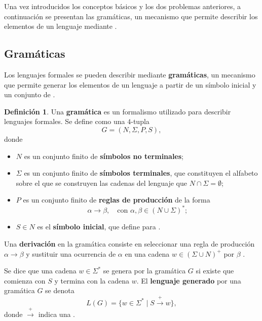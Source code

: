 \documentclass{report}
\theoremstyle{definition}
\newtheorem{definicion}{Definición}[chapter]
\theoremstyle{plain}
\theoremstyle{remark}
\begin{document}
Una vez introducidos los conceptos básicos y los dos problemas anteriores, a continuación se presentan las gramáticas, un mecanismo que permite describir los elementos de un lenguaje mediante .

\subsection{Gramáticas}
\label{sec:gramaticas}

Los lenguajes formales se pueden describir mediante \textbf{gramáticas}, un mecanismo que permite generar los elementos de un lenguaje a partir de un símbolo inicial y un conjunto de .

\begin{definicion}
  Una \textbf{gramática} es un formalismo utilizado para describir lenguajes formales. Se define como una $4$-tupla
\[
  G = (N, \Sigma, P, S),
\]
donde
\begin{itemize}
  \item $N$ es un conjunto finito de  \textbf{símbolos no terminales};
  \item $\Sigma$ es un conjunto finito de  \textbf{símbolos terminales}, que constituyen el alfabeto sobre el que se construyen las cadenas del lenguaje\quitaesto{,}  que $N \cap \Sigma = \emptyset$;
  \item $P$ es un conjunto finito de \textbf{reglas de producción} de la
    forma
    \[
      \alpha \to \beta,
      \quad \text{con } \alpha, \beta \in (N \cup \Sigma)^*;
    \]
      \item $S \in N$ es el \textbf{símbolo inicial}, que define  para .
\end{itemize}
\end{definicion}

Una \textbf{derivación} en la gramática consiste en seleccionar una regla de producción $\alpha \to \beta$ y sustituir una ocurrencia de $\alpha$ en una cadena $w \in (\Sigma \cup N)^+$ por $\beta$ \cite{hopcroft2006introduction}.


Se dice que una cadena $w \in \Sigma^*$ se genera por la gramática $G$ si existe  que comienza con $S$ y termina con la cadena $w$. El \textbf{lenguaje generado} por una gramática $G$ se denota
\[
  L(G) = \{ w \in \Sigma^* \mid S \xrightarrow{+} w \},
\]
donde $\xrightarrow{+}$ indica una .
\end{document}
